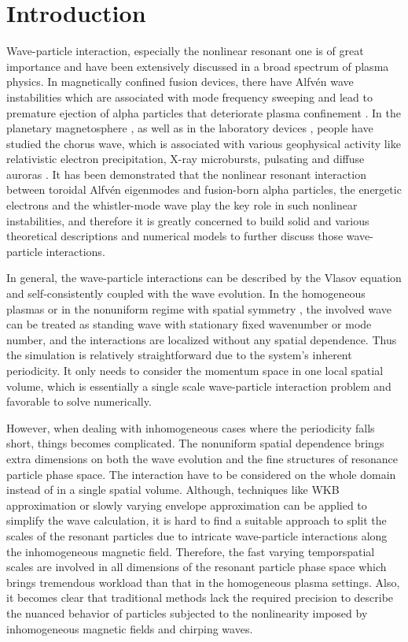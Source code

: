 \section{Introduction}
Wave-particle interaction, especially the nonlinear resonant one is of great importance and have been extensively discussed in a broad spectrum of plasma physics. 
In magnetically confined fusion devices, there have Alfv\'en wave instabilities \cite{chen2016,wang2018} which are associated with mode frequency sweeping and lead to premature ejection of alpha particles that deteriorate plasma confinement \cite{fasoli2007}.
In the planetary magnetosphere \cite{tsurutani1974}, as well as in the laboratory devices \cite{vancompernolle2015,vancompernolle2017a}, people have studied the chorus wave, which is associated with various geophysical activity like relativistic electron precipitation, X-ray microbursts, pulsating and diffuse auroras \cite{kasahara2018,reeves2013,thorne2013}.
It has been demonstrated that the nonlinear resonant interaction between toroidal Alfv\'en eigenmodes and fusion-born alpha particles, the energetic electrons and the whistler-mode wave play the key role in such nonlinear instabilities, and therefore it is greatly concerned to build solid and various theoretical descriptions and numerical models to further discuss those wave-particle interactions.

In general, the wave-particle interactions can be described by the Vlasov equation and self-consistently coupled with the wave evolution. 
In the homogeneous plasmas \cite{lilley2009,breizman2010} or in the nonuniform regime with spatial symmetry \cite{hezaveh2017,hezaveh2020,hezaveh2021}, the involved wave can be treated as standing wave with stationary fixed wavenumber or mode number, and the interactions are localized without any spatial dependence.
Thus the simulation is relatively straightforward due to the system's inherent periodicity. 
It only needs to consider the momentum space in one local spatial volume, which is essentially a single scale wave-particle interaction problem and favorable to solve numerically.

However, when dealing with inhomogeneous cases where the periodicity falls short, things becomes complicated.
The nonuniform spatial dependence brings extra dimensions on both the wave evolution and the fine structures of resonance particle phase space.
The interaction have to be considered on the whole domain instead of in a single spatial volume.
Although, techniques like WKB approximation \cite{wkb} or slowly varying envelope approximation \cite{svap} can be applied to simplify the wave calculation, it is hard to find a suitable approach to split the scales of the resonant particles due to intricate wave-particle interactions along the inhomogeneous magnetic field.
Therefore, the fast varying temporspatial scales are involved in all dimensions of the resonant particle phase space which brings tremendous workload than that in the homogeneous plasma settings.
Also, it becomes clear that traditional methods lack the required precision to describe the nuanced behavior of particles subjected to the nonlinearity imposed by inhomogeneous magnetic fields and chirping waves.

